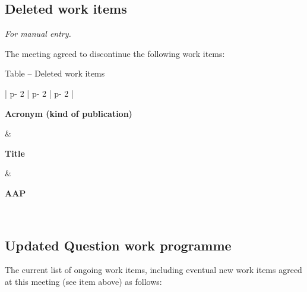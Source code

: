 \subsection{Deleted work items}\label{deleted-work-items}

\textit{For manual entry.}

The meeting agreed to discontinue the following work items:

\begin{center}
Table -- Deleted work items
\end{center}
{\def\LTcaptype{none} %
{\fontsize{9}{11}\selectfont
\begin{longtable}{|
  p{\textwidth - 2\tabcolsep \relax} |
  p{\textwidth - 2\tabcolsep \relax} |
  p{\textwidth - 2\tabcolsep \relax} |}
\hline
\begin{minipage}[c]{\linewidth}\centering \textbf{Acronym (kind of publication)} \end{minipage} &
\begin{minipage}[c]{\linewidth}\centering \textbf{Title} \end{minipage} &
\begin{minipage}[c]{\linewidth}\centering \textbf{AAP} \end{minipage} \\
\hline
\endhead
\deletedWorkItems
\end{longtable}
}
}

\subsection{Updated Question work programme}\label{updated-question-work-programme}

The current list of ongoing work items, including eventual new work items agreed at this meeting (see item above) as follows:

